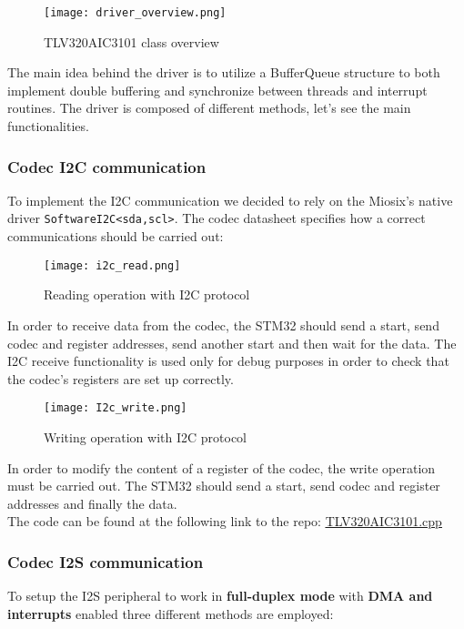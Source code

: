 \documentclass[10pt,a4]{article}
\begin{document}
    \begin{figure}[ht]
        \centering
        \texttt{[image: driver\_overview.png]}
        \caption{TLV320AIC3101 class overview}
    \end{figure}

The main idea behind the driver is to utilize a BufferQueue structure to both implement double buffering and synchronize between threads and interrupt routines. The driver is composed of different methods, let's see the main functionalities.

\subsubsection{Codec I2C communication}
To implement the I2C communication we decided to rely on the Miosix's native driver \lstinline{SoftwareI2C<sda,scl>}. The codec datasheet specifies how a correct communications should be carried out:

    \begin{figure}[ht]
        \centering
        \texttt{[image: i2c\_read.png]}
        \caption{Reading operation with I2C protocol}
    \end{figure}

In order to receive data from the codec, the STM32 should send a start, send codec and register addresses, send another start and then wait for the data. The I2C receive functionality is used only for debug purposes in order to check that the codec's registers are set up correctly.

    \begin{figure}[ht]
        \centering
        \texttt{[image: I2c\_write.png]}
        \caption{Writing operation with I2C protocol}
    \end{figure}

In order to modify the content of a register of the codec, the write operation must be carried out. The STM32 should send a start, send codec and register addresses and finally the data.\\

The code can be found at the following link to the repo:
\href{https://github.com/AleDedor/STM32Nucleo-Codec-Shield/blob/main/NASlib/TLV320AIC3101.cpp}{\underline{TLV320AIC3101.cpp}}

\subsubsection{Codec I2S communication}
To setup the I2S peripheral to work in \textbf{full-duplex mode} with \textbf{DMA and interrupts} enabled three different methods are employed:
\end{document}
